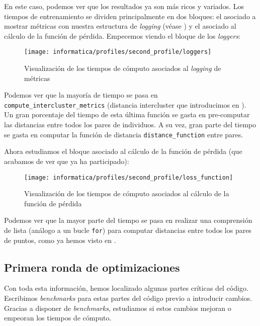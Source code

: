 En este caso, podemos ver que los resultados ya son más ricos y variados. Los tiempos de entrenamiento se dividen principalmente en dos bloques: el asociado a mostrar métricas con nuestra estructura de \textit{logging} (véase ) y el asociado al cálculo de la función de pérdida. Empecemos viendo el bloque de los \textit{loggers}:

\begin{figure}[H]
    \centering
    \texttt{[image: informatica/profiles/second\_profile/loggers]}
    \caption{Visualización de los tiempos de cómputo asociados al \textit{logging} de métricas}
    \label{img:second_profile_tiempos_metricas}
\end{figure}

Podemos ver que la mayoría de tiempo se pasa en \lstinline{compute_intercluster_metrics} (distancia intercluster que introducimos en ). Un gran porcentaje del tiempo de esta última función se gasta en pre-computar las distancias entre todos los pares de individuos. A su vez, gran parte del tiempo se gasta en computar la función de distancia \lstinline{distance_function} entre pares.

Ahora estudiamos el bloque asociado al cálculo de la función de pérdida (que acabamos de ver que ya ha participado):

\begin{figure}[H]
    \centering
    \texttt{[image: informatica/profiles/second\_profile/loss\_function]}
    \caption{Visualización de los tiempos de cómputo asociados al cálculo de la función de pérdida}
\end{figure}

Podemos ver que la mayor parte del tiempo se pasa en realizar una comprensión de lista (análogo a un bucle \lstinline{for}) para computar distancias entre todos los pares de puntos, como ya hemos visto en .

\subsection{Primera ronda de optimizaciones}

Con toda esta información, hemos localizado algunas partes críticas del código. Escribimos \textit{benchmarks} para estas partes del código previo a introducir cambios. Gracias a disponer de \textit{benchmarks}, estudiamos si estos cambios mejoran o empeoran los tiempos de cómputo.

